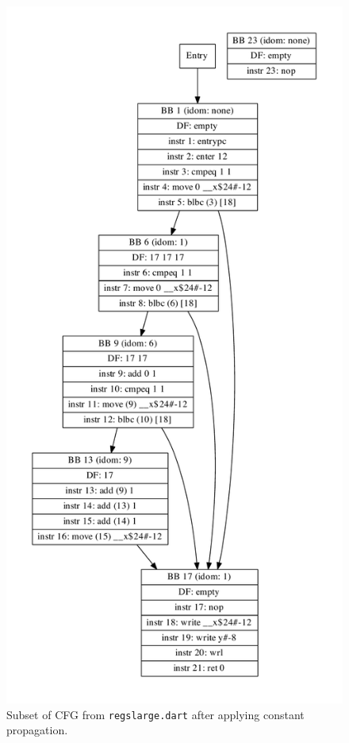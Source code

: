 \documentclass[10pt,twocolumn]{article}
\begin{document}
\begin{figure}
\begin{center}
  \includegraphics[width=0.95\columnwidth]{figs/simple6-postssa.pdf}
\begin{minipage}{0.95\columnwidth}
  \caption{\label{fig:postvn} Subset of CFG from \texttt{regslarge.dart} after applying constant propagation.}
\end{minipage}
\end{center}
\end{figure}
\end{document}
